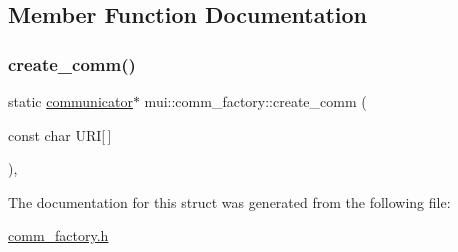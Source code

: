 \subsection{Member Function Documentation}
\mbox{\label{structmui_1_1comm__factory_adc8cb61ea9f3e4458d3e1c40969218c1}} 
\subsubsection{\texorpdfstring{create\+\_\+comm()}{create\_comm()}}
{\footnotesize\ttfamily static \hyperlink{classmui_1_1communicator}{communicator}$\ast$ mui\+::comm\+\_\+factory\+::create\+\_\+comm (\begin{DoxyParamCaption}\item[{const char}]{U\+RI\mbox{[}$\,$\mbox{]} }\end{DoxyParamCaption})\hspace{0.3cm}{\ttfamily [inline]}, {\ttfamily [static]}}



The documentation for this struct was generated from the following file\+:\begin{DoxyCompactItemize}
\item 
\hyperlink{comm__factory_8h}{comm\+\_\+factory.\+h}\end{DoxyCompactItemize}
